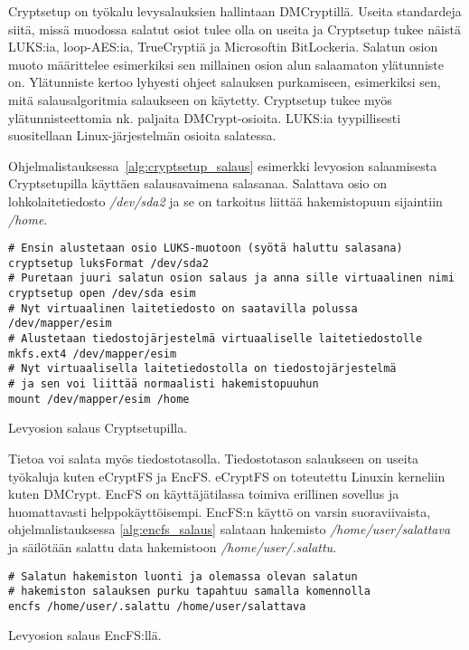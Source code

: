 Cryptsetup on työkalu levysalauksien hallintaan DMCryptillä. Useita standardeja siitä, missä muodossa salatut osiot tulee olla on useita ja Cryptsetup tukee näistä LUKS:ia, loop-AES:ia, TrueCryptiä ja Microsoftin BitLockeria. Salatun osion muoto määrittelee esimerkiksi sen millainen osion alun salaamaton ylätunniste on. Ylätunniste kertoo lyhyesti ohjeet salauksen purkamiseen, esimerkiksi sen, mitä salausalgoritmia salaukseen on käytetty. Cryptsetup tukee myös ylätunnisteettomia nk. paljaita DMCrypt-osioita. LUKS:ia tyypillisesti suositellaan Linux-järjestelmän osioita salatessa.

Ohjelmalistauksessa~\ref{alg:cryptsetup_salaus} esimerkki levyosion salaamisesta Cryptsetupilla käyttäen salausavaimena salasanaa. Salattava osio on lohkolaitetiedosto \textit{/dev/sda2} ja se on tarkoitus liittää hakemistopuun sijaintiin \textit{/home}.~\cite{cryptsetup}

\begin{algorithm}[tbh]
\begin{verbatim}
# Ensin alustetaan osio LUKS-muotoon (syötä haluttu salasana)
cryptsetup luksFormat /dev/sda2
# Puretaan juuri salatun osion salaus ja anna sille virtuaalinen nimi
cryptsetup open /dev/sda esim
# Nyt virtuaalinen laitetiedosto on saatavilla polussa /dev/mapper/esim
# Alustetaan tiedostojärjestelmä virtuaaliselle laitetiedostolle
mkfs.ext4 /dev/mapper/esim
# Nyt virtuaalisella laitetiedostolla on tiedostojärjestelmä
# ja sen voi liittää normaalisti hakemistopuuhun
mount /dev/mapper/esim /home
\end{verbatim}
\caption{Levyosion salaus Cryptsetupilla.\label{alg:cryptsetup_salaus}}
\end{algorithm}
\newpage{}

Tietoa voi salata myös tiedostotasolla. Tiedostotason salaukseen on useita työkaluja kuten eCryptFS ja EncFS. eCryptFS on toteutettu Linuxin kerneliin kuten DMCrypt. EncFS on käyttäjätilassa toimiva erillinen sovellus ja huomattavasti helppokäyttöisempi. EncFS:n käyttö on varsin suoraviivaista, ohjelmalistauksessa \ref{alg:encfs_salaus} salataan hakemisto \textit{/home/user/salattava} ja säilötään salattu data hakemistoon \textit{/home/user/.salattu}.~\cite{encfs}

\begin{algorithm}[tbh]
\begin{verbatim}
# Salatun hakemiston luonti ja olemassa olevan salatun
# hakemiston salauksen purku tapahtuu samalla komennolla
encfs /home/user/.salattu /home/user/salattava
\end{verbatim}
\caption{Levyosion salaus EncFS:llä.\label{alg:encfs_salaus}}
\end{algorithm}
\newpage{}

